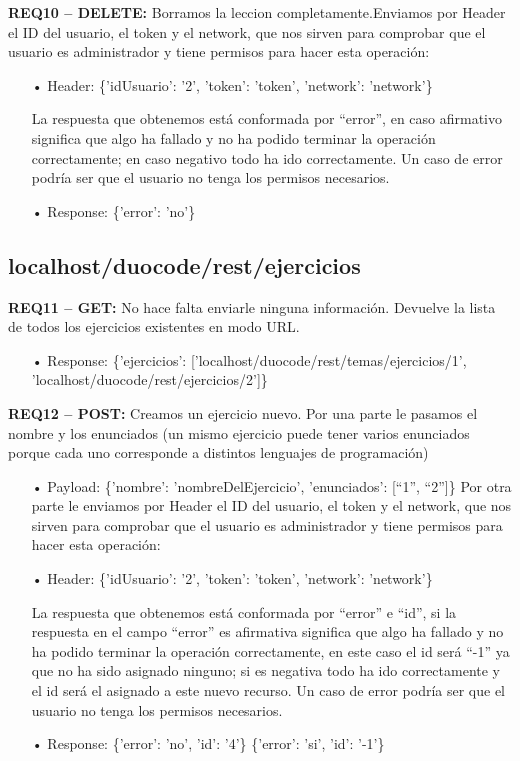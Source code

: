 \textbf{REQ10 – DELETE:} Borramos la leccion completamente.Enviamos por Header el ID del usuario, el token y el network, que nos sirven para comprobar que el usuario es administrador y tiene permisos para hacer esta operación:
\begin{itemize}

\item[•]
Header: 
\{'idUsuario': '2', 'token': 'token', 'network': 'network'\}
\vspace{1em}

La respuesta que obtenemos está conformada por “error”, en caso afirmativo significa que algo ha fallado y no ha podido terminar la operación correctamente; en caso negativo todo ha ido correctamente. Un caso de error podría ser que el usuario no tenga los permisos necesarios.

\item[•] 
Response: 
\{'error': 'no'\}
\end{itemize}

\subsection{localhost/duocode/rest/ejercicios}
\textbf{REQ11 – GET:} No hace falta enviarle ninguna información. Devuelve la lista de todos los ejercicios existentes en modo URL.

\begin{itemize}
\item[•]
Response: 
\{'ejercicios': ['localhost/duocode/rest/temas/ejercicios/1', 'localhost/duocode/rest/ejercicios/2']\}
\end{itemize}

\textbf{REQ12 – POST:} Creamos un ejercicio nuevo. Por una parte le pasamos el nombre y los enunciados (un mismo ejercicio puede tener varios enunciados porque cada uno corresponde a distintos lenguajes de programación)

\begin{itemize}
\item[•]
Payload: 
\{'nombre': 'nombreDelEjercicio', 'enunciados': [“1”, “2”]\}
\vspace{1em}
Por otra parte le enviamos por Header el ID del usuario, el token y el network, que nos sirven para comprobar que el usuario es administrador y tiene permisos para hacer esta operación:

\item[•]
Header: 
\{'idUsuario': '2', 'token': 'token', 'network': 'network'\}

\vspace{1em}
La respuesta que obtenemos está conformada por “error” e “id”, si la respuesta en el campo “error” es afirmativa significa que algo ha fallado y no ha podido terminar la operación correctamente, en este caso el id será “-1” ya que no ha sido asignado ninguno; si es negativa todo ha ido correctamente y el id será el asignado a este nuevo recurso. Un caso de error podría ser que el usuario no tenga los permisos necesarios.

\item[•]
Response: 
\{'error': 'no', 'id': '4'\}
\{'error': 'si', 'id': '-1'\}
\end{itemize}

